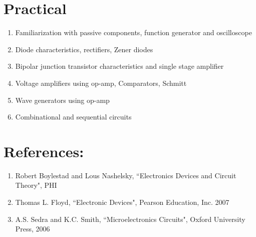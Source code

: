 \section*{Practical}
\begin{enumerate}
    \item Familiarization with passive components, function generator and oscilloscope
    \item Diode characteristics, rectifiers, Zener diodes
    \item Bipolar junction transistor characteristics and single stage amplifier
    \item Voltage amplifiers using op-amp, Comparators, Schmitt
    \item Wave generators using op-amp
    \item Combinational and sequential circuits
\end{enumerate}


\section*{References:}
\begin{enumerate}
    \item Robert Boylestad and Lous Nashelsky, ``Electronics Devices and Circuit Theory", PHI
    \item Thomas L. Floyd, ``Electronic Devices", Pearson Education, Inc. 2007
    \item A.S. Sedra and K.C. Smith, ``Microelectronics Circuits", Oxford University Press, 2006
\end{enumerate}